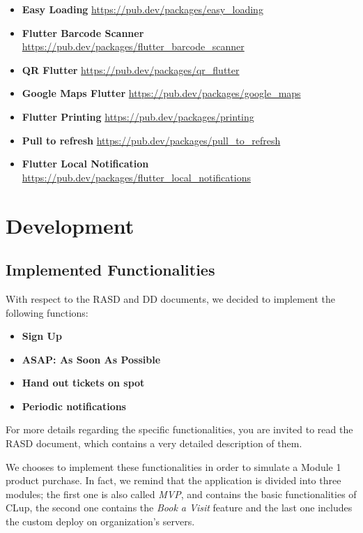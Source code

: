\documentclass[table, 12pt]{article}
\begin{document}
\begin{itemize}
    \item \textbf{Easy Loading} \href{https://pub.dev/packages/easy_loading}{https://pub.dev/packages/easy\_loading}
    \item \textbf{Flutter Barcode Scanner} \href{https://pub.dev/packages/flutter_barcode_scanner}{https://pub.dev/packages/flutter\_barcode\_scanner}
    \item \textbf{QR Flutter} \href{https://pub.dev/packages/qr_flutter}{https://pub.dev/packages/qr\_flutter}
    \item \textbf{Google Maps Flutter} \href{https://pub.dev/packages/google_maps}{https://pub.dev/packages/google\_maps}
    \item \textbf{Flutter Printing} \href{https://pub.dev/packages/printing}{https://pub.dev/packages/printing}
    \item \textbf{Pull to refresh} \href{https://pub.dev/packages/pull_to_refresh}{https://pub.dev/packages/pull\_to\_refresh}
    \item \textbf{Flutter Local Notification} \href{https://pub.dev/packages/flutter_local_notifications}{https://pub.dev/packages/flutter\_local\_notifications}
\end{itemize}

\newpage
\section{Development}
\subsection{Implemented Functionalities}
With respect to the RASD and DD documents, we decided to implement the following functions:
\begin{itemize}
    \item \textbf{Sign Up}
    \item \textbf{ASAP: As Soon As Possible}
    \item \textbf{Hand out tickets on spot}
    \item \textbf{Periodic notifications}
\end{itemize}
For more details regarding the specific functionalities, you are invited to read the RASD document, which contains a very detailed description of them.

We chooses to implement these functionalities in order to simulate a Module 1 product purchase. In fact, we remind that the application is divided into three modules; the first one is also called \textit{MVP}, and contains the basic functionalities of CLup, the second one contains the \textit{Book a Visit} feature and the last one includes the custom deploy on organization's servers.
\end{document}
